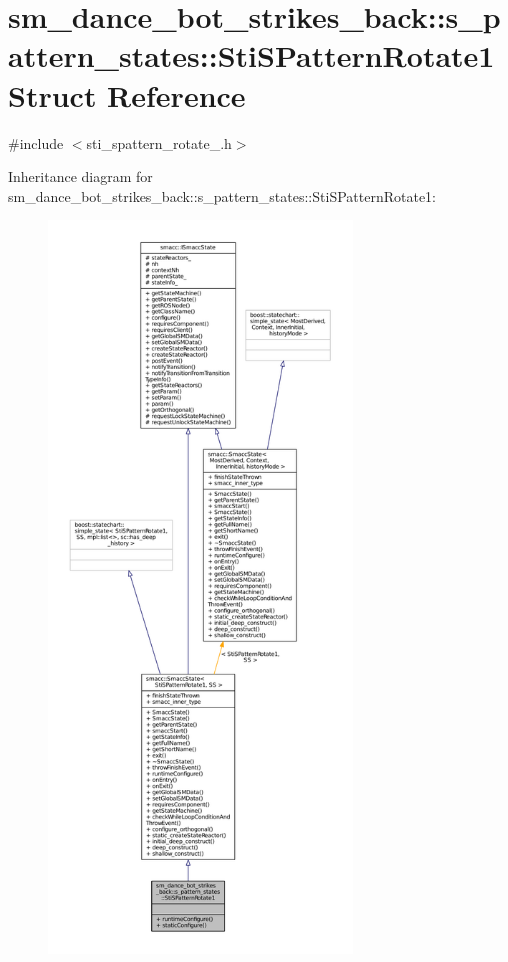 \hypertarget{structsm__dance__bot__strikes__back_1_1s__pattern__states_1_1StiSPatternRotate1}{}\section{sm\+\_\+dance\+\_\+bot\+\_\+strikes\+\_\+back\+:\+:s\+\_\+pattern\+\_\+states\+:\+:Sti\+S\+Pattern\+Rotate1 Struct Reference}
\label{structsm__dance__bot__strikes__back_1_1s__pattern__states_1_1StiSPatternRotate1}


{\ttfamily \#include $<$sti\+\_\+spattern\+\_\+rotate\+\_.\+h$>$}



Inheritance diagram for sm\+\_\+dance\+\_\+bot\+\_\+strikes\+\_\+back\+:\+:s\+\_\+pattern\+\_\+states\+:\+:Sti\+S\+Pattern\+Rotate1\+:
\nopagebreak
\begin{figure}[H]
\begin{center}
\leavevmode
\includegraphics[height=550pt]{structsm__dance__bot__strikes__back_1_1s__pattern__states_1_1StiSPatternRotate1__inherit__graph}
\end{center}
\end{figure}


